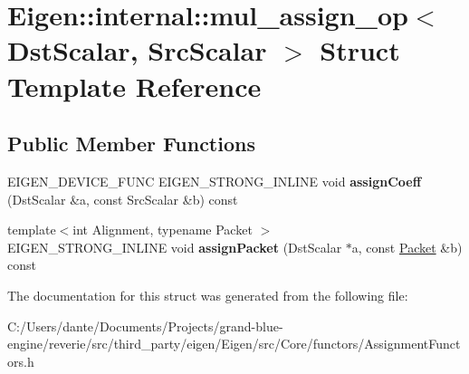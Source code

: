 \hypertarget{struct_eigen_1_1internal_1_1mul__assign__op}{}\section{Eigen\+::internal\+::mul\+\_\+assign\+\_\+op$<$ Dst\+Scalar, Src\+Scalar $>$ Struct Template Reference}
\label{struct_eigen_1_1internal_1_1mul__assign__op}
\subsection*{Public Member Functions}
\begin{DoxyCompactItemize}
\item 
\mbox{\label{struct_eigen_1_1internal_1_1mul__assign__op_acd7bada53be090d217570521d56fddfd}} 
E\+I\+G\+E\+N\+\_\+\+D\+E\+V\+I\+C\+E\+\_\+\+F\+U\+NC E\+I\+G\+E\+N\+\_\+\+S\+T\+R\+O\+N\+G\+\_\+\+I\+N\+L\+I\+NE void {\bfseries assign\+Coeff} (Dst\+Scalar \&a, const Src\+Scalar \&b) const
\item 
\mbox{\label{struct_eigen_1_1internal_1_1mul__assign__op_a3d86808dcbcc709ee0998c6a89320ecb}} 
{\footnotesize template$<$int Alignment, typename Packet $>$ }\\E\+I\+G\+E\+N\+\_\+\+S\+T\+R\+O\+N\+G\+\_\+\+I\+N\+L\+I\+NE void {\bfseries assign\+Packet} (Dst\+Scalar $\ast$a, const \mbox{\hyperlink{union_eigen_1_1internal_1_1_packet}{Packet}} \&b) const
\end{DoxyCompactItemize}


The documentation for this struct was generated from the following file\+:\begin{DoxyCompactItemize}
\item 
C\+:/\+Users/dante/\+Documents/\+Projects/grand-\/blue-\/engine/reverie/src/third\+\_\+party/eigen/\+Eigen/src/\+Core/functors/Assignment\+Functors.\+h\end{DoxyCompactItemize}

